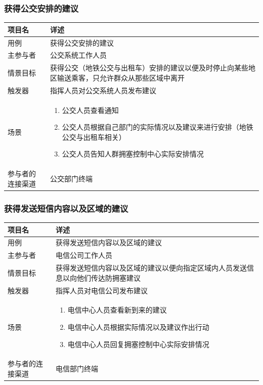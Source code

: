 \documentclass{ctexrep}
\begin{document}
\subsubsection{获得公交安排的建议}
\begin{longtable}{p{2cm} | p{10cm}}
\hline
项目名 & 详述 \\
\hline
\hline
用例 & 获得公交安排的建议\\
\hline
主参与者 & 公交系统工作人员\\
\hline
情景目标 &  获得公交（地铁公交与出租车）安排的建议以便及时停止向某些地区输送乘客，只允许群众从那些区域中离开\\
\hline
触发器 & 指挥人员对公交系统人员发布建议\\
\hline
场景 & \begin{enumerate}
	\item 公交人员查看通知
	\item 公交人员根据自己部门的实际情况以及建议来进行安排（地铁公交与出租车相关）
	\item 公交人员告知人群拥塞控制中心实际安排情况
\end{enumerate} \\
\hline
参与者的连接渠道 & 公交部门终端\\
\hline
\end{longtable}

\subsubsection{获得发送短信内容以及区域的建议}
\begin{longtable}{p{2cm} | p{10cm}}
\hline
项目名 & 详述 \\
\hline
\hline
用例 & 获得发送短信内容以及区域的建议\\
\hline
主参与者 & 电信公司工作人员\\
\hline
情景目标 & 获得发送短信内容以及区域的建议以便向指定区域内人员发送信息以向他们传达防拥塞建议 \\
\hline
触发器 & 指挥人员对电信公司发布建议\\
\hline
场景 & \begin{enumerate}
	\item 电信中心人员查看新到来的建议
	\item 电信中心人员根据实际情况以及建议作出行动
	\item 电信中心人员回复拥塞控制中心实际安排情况
\end{enumerate} \\
\hline
参与者的连接渠道 & 电信部门终端 \\
\hline
\end{longtable}
\end{document}
